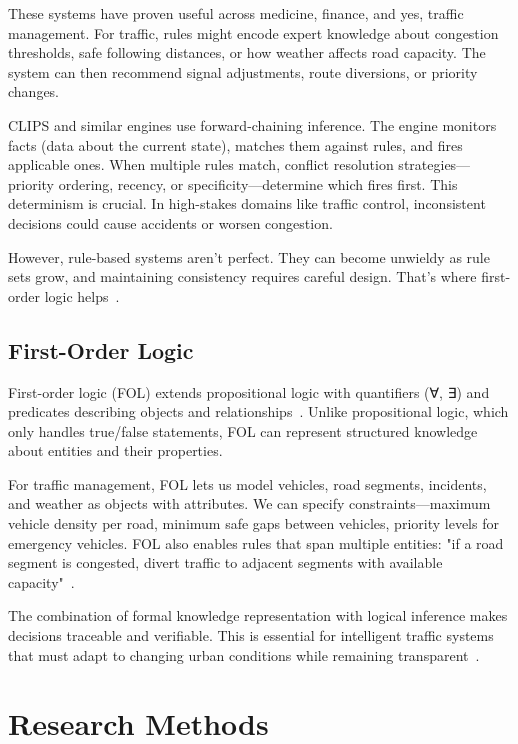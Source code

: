 \documentclass{article}
\begin{document}
These systems have proven useful across medicine, finance, and yes, traffic management. For traffic, rules might encode expert knowledge about congestion thresholds, safe following distances, or how weather affects road capacity. The system can then recommend signal adjustments, route diversions, or priority changes.

CLIPS and similar engines use forward-chaining inference. The engine monitors facts (data about the current state), matches them against rules, and fires applicable ones. When multiple rules match, conflict resolution strategies—priority ordering, recency, or specificity—determine which fires first. This determinism is crucial. In high-stakes domains like traffic control, inconsistent decisions could cause accidents or worsen congestion.

However, rule-based systems aren't perfect. They can become unwieldy as rule sets grow, and maintaining consistency requires careful design. That's where first-order logic helps~\cite{karagiannis_domain_2016}.

\subsection{First-Order Logic}
First-order logic (FOL) extends propositional logic with quantifiers (∀, ∃) and predicates describing objects and relationships~\cite{russell_ai_2009}. Unlike propositional logic, which only handles true/false statements, FOL can represent structured knowledge about entities and their properties.

For traffic management, FOL lets us model vehicles, road segments, incidents, and weather as objects with attributes. We can specify constraints—maximum vehicle density per road, minimum safe gaps between vehicles, priority levels for emergency vehicles. FOL also enables rules that span multiple entities: "if a road segment is congested, divert traffic to adjacent segments with available capacity"~\cite{xu_consistency_2006}.

The combination of formal knowledge representation with logical inference makes decisions traceable and verifiable. This is essential for intelligent traffic systems that must adapt to changing urban conditions while remaining transparent~\cite{spillo_neuro_symbolic_2024}.

\section{Research Methods}
\end{document}
